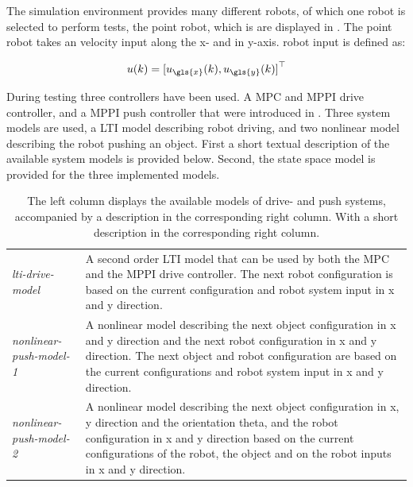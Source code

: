 The simulation environment provides many different robots, of which one robot is selected to perform tests, the point robot, which is are displayed in . The point robot takes an velocity input along the \gls{x}- and in \gls{y}-axis.\bs
robot input is defined as:\bs

\[ u(k) = {[ u_{\gls{x}}(k), u_{\gls{y}}(k) ]}^\top \]


During testing three controllers have been used. A \ac{MPC} and \ac{MPPI} drive controller, and a \ac{MPPI} push controller that were introduced in . Three system models are used, a \ac{LTI} model describing robot driving, and two nonlinear model describing the robot pushing an object. First a short textual description of the available system models is provided below. Second, the state space model is provided for the three implemented models.\bs


\begin{table}[H]
\caption{The left column displays the available models of drive- and push systems, accompanied by a description in the corresponding right column. With a short description in the corresponding right column.}\label{table:available_system_models}
\centering
\begin{tabular}%
  {>{\raggedright\arraybackslash}p{}%
   >{\raggedright\arraybackslash}p{}}
\textit{lti-drive-model} & A second order \ac{LTI} model that can be used by both the \ac{MPC} and the \ac{MPPI} drive controller. The next robot configuration is based on the current configuration and robot system input in \gls{x} and \gls{y} direction. \\
\textit{nonlinear-push-model-1} & A nonlinear model describing the next object configuration in \gls{x} and \gls{y} direction and the next robot configuration in \gls{x} and \gls{y} direction. The next object and robot configuration are based on the current configurations and robot system input in \gls{x} and \gls{y} direction.\\
\textit{nonlinear-push-model-2} & A nonlinear model describing the next object configuration in \gls{x}, \gls{y} direction and the orientation \gls{theta}, and the robot configuration in \gls{x} and \gls{y} direction based on the current configurations of the robot, the object and on the robot inputs in \gls{x} and \gls{y} direction.\\
\end{tabular}
\end{table}

